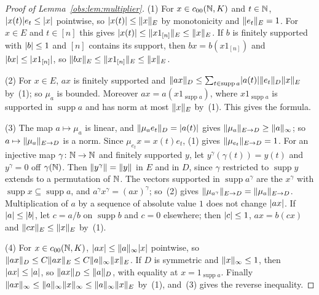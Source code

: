 \begin{proof}[Proof of Lemma~\ref{obs:lem:multiplier}]
(1) For $x\in c_{00}(\mathbb N,K)$ and $t\in\mathbb N$, $\lvert x(t)\rvert e_t\le\lvert x\rvert$ pointwise, so $\lvert x(t)\rvert\le\lVert x\rVert_E$ by monotonicity
and $\lVert e_t\rVert_E=1$. For $x\in E$ and $t\in[n]$ this gives $\lvert x(t)\rvert\le\lVert x1_{[n]}\rVert_E\le\lVert x\rVert_E$. If $b$ is
finitely supported with $\lvert b\rvert\le1$ and $[n]$ contains its support, then $bx=b(x1_{[n]})$ and $\lvert bx\rvert\le\lvert x1_{[n]}\rvert$,
so $\lVert bx\rVert_E\le\lVert x1_{[n]}\rVert_E\le\lVert x\rVert_E$.

(2) For $x\in E$, $ax$ is finitely supported and $\lVert ax\rVert_D\le\sum_{t\in\operatorname{supp}a}\lvert a(t)\rvert\lVert e_t\rVert_D
\lVert x\rVert_E$ by~(1); so $\mu_a$ is bounded. Moreover $ax=a(x1_{\operatorname{supp}a})$, where $x1_{\operatorname{supp}a}$ is
supported in $\operatorname{supp}a$ and has norm at most $\lVert x\rVert_E$ by~(1). This gives the formula.

(3) The map $a\mapsto\mu_a$ is linear, and $\lVert \mu_ae_t\rVert_D=\lvert a(t)\rvert$ gives $\lVert \mu_a\rVert_{E\to D}\ge\lVert a\rVert_\infty$;
so $a\mapsto\lVert \mu_a\rVert_{E\to D}$ is a norm. Since $\mu_{e_t}x=x(t)e_t$, (1) gives $\lVert \mu_{e_t}\rVert_{E\to D}=1$. For an
injective map $\gamma\colon\mathbb N\to\mathbb N$ and finitely supported $y$, let $y^\gamma(\gamma(t))=y(t)$ and $y^\gamma=0$ off
$\gamma(\mathbb N)$. Then $\lVert y^\gamma\rVert=\lVert y\rVert$ in $E$ and in $D$, since $\gamma$ restricted to $\operatorname{supp}y$
extends to a permutation of $\mathbb N$. The vectors supported in $\operatorname{supp}a^\gamma$ are the $x^\gamma$ with
$\operatorname{supp}x\subseteq\operatorname{supp}a$, and $a^\gamma x^\gamma=(ax)^\gamma$; so~(2) gives
$\lVert \mu_{a^\gamma}\rVert_{E\to D}=\lVert \mu_a\rVert_{E\to D}$. Multiplication of $a$ by a sequence of absolute value $1$ does not
change $\lvert ax\rvert$. If $\lvert a\rvert\le\lvert b\rvert$, let $c=a/b$ on $\operatorname{supp}b$ and $c=0$ elsewhere; then $\lvert c\rvert\le1$,
$ax=b(cx)$ and $\lVert cx\rVert_E\le\lVert x\rVert_E$ by~(1).

(4) For $x\in c_{00}(\mathbb N,K)$, $\lvert ax\rvert\le\lVert a\rVert_\infty\lvert x\rvert$ pointwise, so
$\lVert ax\rVert_D\le C\lVert ax\rVert_E\le C\lVert a\rVert_\infty\lVert x\rVert_E$. If $D$ is symmetric and $\lVert x\rVert_\infty\le1$, then
$\lvert ax\rvert\le\lvert a\rvert$, so $\lVert ax\rVert_D\le\lVert a\rVert_D$, with equality at $x=1_{\operatorname{supp}a}$. Finally
$\lVert ax\rVert_\infty\le\lVert a\rVert_\infty\lVert x\rVert_\infty\le\lVert a\rVert_\infty\lVert x\rVert_E$ by~(1), and~(3) gives the reverse inequality.
\end{proof}

